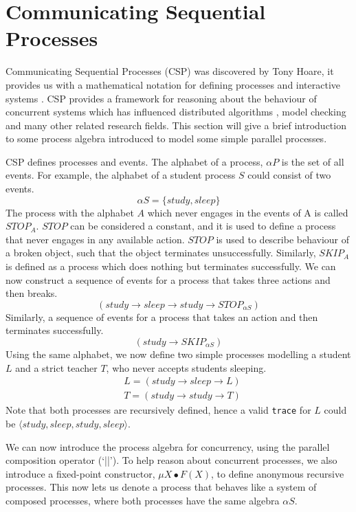 \section{Communicating Sequential Processes} \label{csp_section}
Communicating Sequential Processes (CSP) was discovered by Tony Hoare, it provides us with a mathematical notation for defining processes and interactive systems \cite{csp_paper}. CSP provides a framework for reasoning about the behaviour of concurrent systems which has influenced distributed algorithms \cite{distributed_algorithms_na_lynch}, model checking \cite{model_checking} and many other related research fields. This section will give a brief introduction to some process algebra introduced to model some simple parallel processes.
\par
CSP defines processes and events. The alphabet of a process, $\alpha P$ is the set of all events. For example, the alphabet of a student process $S$ could consist of two events.
\[
\alpha S = \{study, sleep\}
\]
The process with the alphabet $A$ which never engages in the events of A is called $STOP_A$. $STOP$ can be considered a constant, and it is used to define a process that never engages in any available action. $STOP$ is used to describe behaviour of a broken object, such that the object terminates unsuccessfully. Similarly, $SKIP_A$ is defined as a process which does nothing but terminates successfully. We can now construct a sequence of events for a process that takes three actions and then breaks.
\[
(study \rightarrow sleep \rightarrow study \rightarrow STOP_{\alpha S})
\]
Similarly, a sequence of events for a process that takes an action and then terminates successfully.
\[
(study \rightarrow SKIP_{\alpha S})
\]
Using the same alphabet, we now define two simple processes modelling a student $L$ and a strict teacher $T$, who never accepts students sleeping.
\[
\begin{aligned}
& L = (study \rightarrow sleep \rightarrow L) \\
& T = (study \rightarrow study \rightarrow T) 
\end{aligned}
\]
Note that both processes are recursively defined, hence a valid \texttt{trace} for $L$ could be $\langle study, sleep, study, sleep \rangle$.
\par
We can now introduce the process algebra for concurrency, using the parallel composition operator (`||'). To help reason about concurrent processes, we also introduce a fixed-point constructor, $\mu X \bullet F(X)$, to define anonymous recursive processes. This now lets us denote a process that behaves like a system of composed processes, where both processes have the same algebra $\alpha S$.
